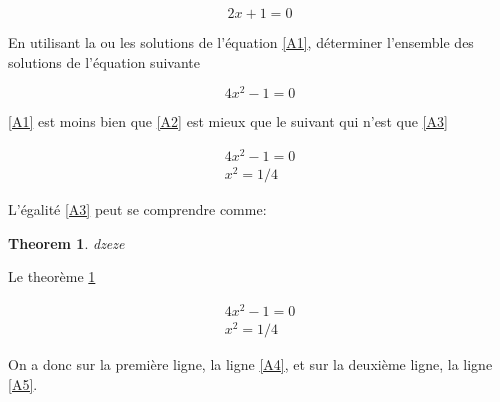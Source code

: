 \documentclass{book}
\newtheorem{theo}{Theorem}
\begin{document}
\begin{equation}
 \label{A1}
 2x+1=0
\end{equation}


En utilisant la ou les solutions de l'équation \eqref{A1}, déterminer l'ensemble des solutions de l'équation suivante

\begin{equation}
 \label{A2}
 4x^{2}-1=0
\end{equation}

\eqref{A1}
est moins bien que 
\eqref{A2}
est mieux que le suivant qui n'est que  \eqref{A3}



\begin{align}
 \label{A3}
 4x^{2}-1=0\\
  x^{2}=1/4
\end{align}

L'égalité \eqref{A3} peut se comprendre comme:




\begin{theo}
 \label{theo1}
 dzeze
\end{theo}

Le theorème \ref{theo1}





\begin{align}
 \label{A4}
 4x^{2}-1=0\\
 \label{A5}
  x^{2}=1/4
\end{align}

On a donc sur la première ligne, la ligne \eqref{A4}, et sur la deuxième ligne, la ligne \eqref{A5}.
\end{document}
